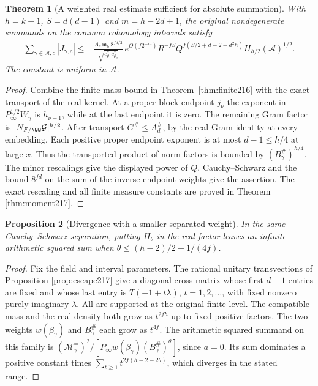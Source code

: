 \documentclass[a4paper,11pt]{article}
\newtheorem{proposition}{Proposition}[section]
\newtheorem{theorem}[proposition]{Theorem}
\theoremstyle{definition}
\theoremstyle{remark}
\numberwithin{equation}{section}
\begin{document}
\begin{theorem}[A weighted real estimate sufficient for absolute summation]
\label{thm:moment218}
With \(h=k-1\), \(S=d(d-1)\) and \(m=h-2d+1\), the original
nondegenerate summands on the common cohomology intervals satisfy
\begin{align*}
 \sum_{\gamma\in\mathcal A,c}|J_{\gamma,c}|
 \le {}&
 \frac{A_*\,\mathfrak m_h\,8^{fd/2}}{\sqrt{c_{\rho_1}^*c_{\rho_2}^*}}\,
  e^{O(f2^{-m})}R^{-fS}
  Q^{f(S/2+d-2-d^2h)} H_{h/2}(\mathcal A)^{1/2}.
\end{align*}
The constant is uniform in \(\mathcal A\).
\end{theorem}
\begin{proof}
Combine the finite mass bound in Theorem~\ref{thm:finite216}
with the exact transport of the real kernel. At a proper block
endpoint \(j_\nu\) the exponent in \(P_\infty^{1/2}W_\gamma\)
is \(h_{\nu+1}\), while at the last endpoint it is zero. The
remaining Gram factor is \(|N_{F/\QQ}\mathcal G|^{h/2}\).
After transport \(G^\#\le A_d^\#\), by the real Gram identity
at every embedding. Each positive proper endpoint exponent
is at most \(d-1\le h/4\) at large \(x\). Thus the transported
product of norm factors is bounded by \((B_\gamma^\#)^{h/4}\).
The minor rescalings give the displayed power of \(Q\).
Cauchy--Schwarz and the bound \(8^{fd}\) on the sum of the
inverse endpoint weights give the assertion. The exact rescaling
and all finite measure constants are proved in
Theorem \ref{thm:moment217}.
\end{proof}

\begin{proposition}[Divergence with a smaller separated weight]
\label{prop:necessary218}
In the same Cauchy--Schwarz separation, putting \(H_\theta\)
in the real factor leaves an infinite arithmetic squared sum
when \(\theta\le(h-2)/2+1/(4f)\).
\end{proposition}
\begin{proof}
Fix the field and interval parameters. The rational unitary
transvections of
Proposition \ref{prop:escape217}
give a diagonal cross matrix whose first \(d-1\) entries are
fixed and whose last entry is \(T(-1+t\lambda)\),
\(t=1,2,\ldots\), with fixed nonzero purely imaginary \(\lambda\).
All are supported at the original finite level. The compatible
mass and the real density both grow as \(t^{2fh}\) up to fixed
positive factors. The two weights \(w(\beta_\gamma)\) and
\(B_\gamma^\#\) each grow as \(t^{4f}\). The arithmetic squared
summand on this family is
\((\mathcal M_\gamma^{=})^2/
 [P_\infty w(\beta_\gamma)(B_\gamma^\#)^\theta]\), since
\(a=0\). Its sum dominates a positive constant times
\(\sum_{t\ge1}t^{2f(h-2-2\theta)}\), which diverges in the
stated range.
\end{proof}
\end{document}
